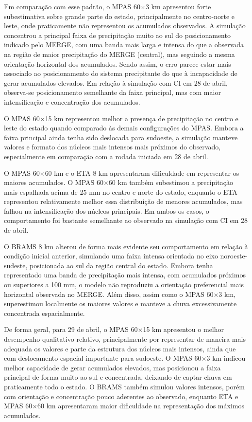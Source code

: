 \documentclass[12pt,a4paper,oneside]{book}
\begin{document}
Em comparação com esse padrão, o MPAS 60$\times$3 km apresentou forte subestimativa sobre grande parte do estado, principalmente no centro-norte e leste, onde praticamente não representou os acumulados observados. A simulação concentrou a principal faixa de precipitação muito ao sul do posicionamento indicado pelo MERGE, com uma banda mais larga e intensa do que a observada na região de maior precipitação do MERGE (central), mas seguindo a mesma orientação horizontal dos acumulados. Sendo assim, o erro parece estar mais associado ao posicionamento do sistema precipitante do que à incapacidade de gerar acumulados elevados. Em relação à simulação com CI em 28 de abril, observa-se posicionamento semelhante da faixa principal, mas com maior intensificação e concentração dos acumulados.

O MPAS 60$\times$15 km representou melhor a presença de precipitação no centro e leste do estado quando comparado às demais configurações do MPAS. Embora a faixa principal ainda tenha sido deslocada para sudoeste, a simulação manteve valores e formato dos núcleos mais intensos mais próximos do observado, especialmente em comparação com a rodada iniciada em 28 de abril.

O MPAS 60$\times$60 km e o ETA 8 km apresentaram dificuldade em representar os maiores acumulados. O MPAS 60$\times$60 km também subestimou a precipitação mais espalhada acima de 25 mm no centro e norte do estado, enquanto o ETA representou relativamente melhor essa distribuição de menores acumulados, mas falhou na intensificação dos núcleos principais. Em ambos os casos, o comportamento foi bastante semelhante ao observado na simulação com CI em 28 de abril.

O BRAMS 8 km alterou de forma mais evidente seu comportamento em relação à condição inicial anterior, simulando uma faixa intensa orientada no eixo noroeste-sudeste, posicionada ao sul da região central do estado. Embora tenha representado uma banda de precipitação mais intensa, com acumulados próximos ou superiores a 100 mm, o modelo não reproduziu a orientação preferencial mais horizontal observada no MERGE. Além disso, assim como o MPAS 60$\times$3 km, superestimou localmente os maiores valores e manteve a chuva excessivamente concentrada espacialmente.

De forma geral, para 29 de abril, o MPAS 60$\times$15 km apresentou o melhor desempenho qualitativo relativo, principalmente por representar de maneira mais adequada os valores e parte da estrutura dos núcleos mais intensos, ainda que com deslocamento espacial importante para sudoeste. O MPAS 60$\times$3 km indicou melhor capacidade de gerar acumulados elevados, mas posicionou a faixa principal de forma muito ao sul e concentrada, deixando de captar chuva em praticamente todo o estado. O BRAMS também simulou valores intensos, porém com orientação e concentração pouco aderentes ao observado, enquanto ETA e MPAS 60$\times$60 km apresentaram maior dificuldade na representação dos máximos acumulados.
\end{document}
